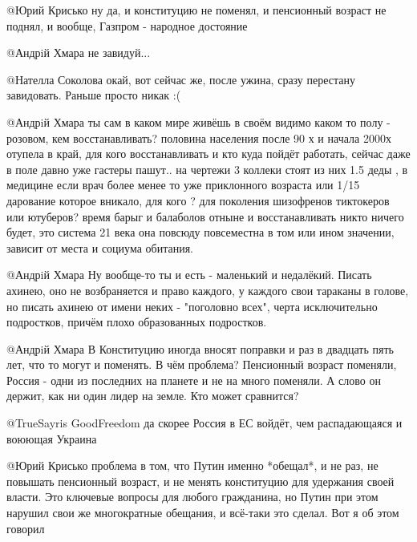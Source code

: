 \begin{itemize}
\begin{itemize}

@Юрий Крисько  ну да, и конституцию не поменял, и пенсионный возраст не
поднял, и вообще, Газпром - народное достояние


@Андрiй Хмара  не завидуй...


@Нателла Соколова  окай, вот сейчас же, после ужина, сразу перестану
завидовать. Раньше просто никак :(


@Андрiй Хмара  ты сам в каком мире живёшь в своём видимо каком то полу -
розовом, кем восстанавливать? половина населения после 90 х и начала 2000х
отупела в край, для кого восстанавливать и кто куда пойдёт работать, сейчас
даже в поле давно уже гастеры пашут.. на чертежи 3 коллеки стоят из них 1.5
деды , в медицине если врач более менее то уже приклонного возраста или 1/15
дарование которое вникало, для кого ? для поколения шизофренов тиктокеров или
ютуберов? время барыг и балаболов отныне и восстанавливать никто ничего будет,
это система 21 века она повсюду повсеместна в том или ином значении, зависит
от места и социума обитания.



@Андрiй Хмара  Ну вообще-то ты и есть - маленький и недалёкий. Писать ахинею,
оно не возбраняется и право каждого, у каждого свои тараканы в голове, но
писать ахинею от имени неких - "поголовно всех", черта исключительно
подростков, причём плохо образованных подростков.


@Андрiй Хмара В Конституцию иногда вносят поправки и раз в двадцать пять лет,
что то могут и поменять. В чём проблема? Пенсионный возраст поменяли,
Россия - одни из последних на планете и не на много поменяли. А слово он
держит, как ни один лидер на земле. Кто может сравнится?


@TrueSayris GoodFreedom  да скорее Россия в ЕС войдёт, чем распадающаяся и
воюющая Украина


@Юрий Крисько  проблема в том, что Путин именно *обещал*, и не раз, не
повышать пенсионный возраст, и не менять конституцию для удержания своей
власти. Это ключевые вопросы для любого гражданина, но Путин при этом нарушил
свои же многократные обещания, и всё-таки это сделал. Вот я об этом говорил


\end{itemize}
\end{itemize}
